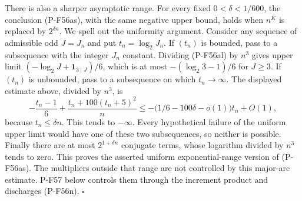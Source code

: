There is also a sharper asymptotic range. For every fixed
$0<\delta<1/600$, the conclusion (P-F56as), with the
same negative upper bound, holds when $n^K$ is replaced
by $2^{\delta n}$. We spell out the uniformity argument.
Consider any sequence of admissible odd $J=J_n$ and put
$t_n=\log_2J_n$. If $(t_n)$ is bounded, pass to a
subsequence with the integer $J_n$ constant. Dividing
(P-F56al) by $n^3$ gives upper limit
$(-\log_2J+\mathbf1_{3\mid J})/6$, which is at most
$-(\log_2 3-1)/6$ for $J\ge3$.
If $(t_n)$ is unbounded, pass to a subsequence on which
$t_n\to\infty$. The displayed estimate above, divided
by $n^3$, is
\[
 -\frac{t_n-1}{6}
        +\frac{t_n+100(t_n+5)^2}{n}
 \le-\bigl(1/6-100\delta-o(1)\bigr)t_n+O(1),
\]
because $t_n\le\delta n$. This tends to $-\infty$.
Every hypothetical failure of the uniform upper limit
would have one of these two subsequences, so neither
is possible. Finally there are at most $2^{1+\delta n}$
conjugate terms, whose logarithm divided by $n^3$ tends
to zero. This proves the asserted uniform exponential-range
version of (P-F56as). The multipliers outside that range are not controlled by this
major-arc estimate. P-F57 below controls them through the increment
product and discharges (P-F56n).
\hfill$\square$
